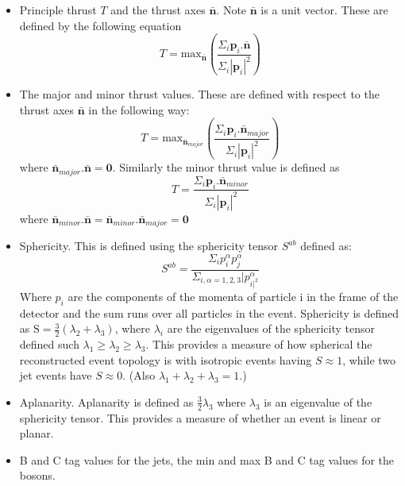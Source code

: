 \begin{itemize}
\item Principle thrust $T$ and the thrust axes $\bar{\textbf{n}}$. Note $\bar{\textbf{n}}$ is a unit vector. These are defined by the following equation
\begin{equation}
T = \text{max}_{\bar{\textbf{n}}} (\frac{\Sigma_{i} \textbf{p}_{i}.\bar{\textbf{n}}}{\Sigma_{i} |\textbf{p}_{i}|^{2}})
\end{equation}
\item The major and minor thrust values. These are defined with respect to the thrust axes $\bar{\textbf{n}}$ in the following way:
\begin{equation}
T = \text{max}_{\bar{\textbf{n}}_{major}} (\frac{\Sigma_{i} \textbf{p}_{i}.\bar{\textbf{n}}_{major}}{\Sigma_{i} |\textbf{p}_{i}|^{2}})
\end{equation}
where $\bar{\textbf{n}}_{major}.\bar{\textbf{n}} = \textbf{0}$. Similarly the minor thrust value is defined as 
\begin{equation}
T = \frac{\Sigma_{i} \textbf{p}_{i}.\bar{\textbf{n}}_{minor}}{\Sigma_{i} |\textbf{p}_{i}|^{2}}
\end{equation}
where $\bar{\textbf{n}}_{minor}.\bar{\textbf{n}} = \bar{\textbf{n}}_{minor}.\bar{\textbf{n}}_{major} =\textbf{0}$
\item Sphericity. This is defined using the sphericity tensor $S^{ab}$ defined as:
\begin{equation}
S^{ab} = \frac{\Sigma_{i}p^{\alpha}_{i}p^{\alpha}_{j}}{\Sigma_{i,\alpha=1,2,3}|p^{\alpha}_{i|^{2}}}
\end{equation}
Where $p_{i}$ are the components of the momenta of particle i in the frame of the detector and the sum runs over all particles in the event. Sphericity is defined as $\text{S} = \frac{3}{2}(\lambda_{2} + \lambda_{3})$, where $\lambda_{i}$ are the eigenvalues of the sphericity tensor defined such $\lambda_{1} \geq \lambda_{2} \geq \lambda_{3}$.  This provides a measure of how spherical the reconstructed event topology is with isotropic events having $S \approx 1$, while two jet events have $S \approx 0$.  (Also $\lambda_{1} + \lambda_{2} + \lambda_{3} = 1$.)
\item Aplanarity. Aplanarity is defined as $\frac{3}{2} \lambda_{3}$ where $\lambda_{3}$ is an eigenvalue of the sphericity tensor.  This provides a measure of whether an event is linear or planar.
\item B and C tag values for the jets, the min and max B and C tag values for the bosons.
\end{itemize}


